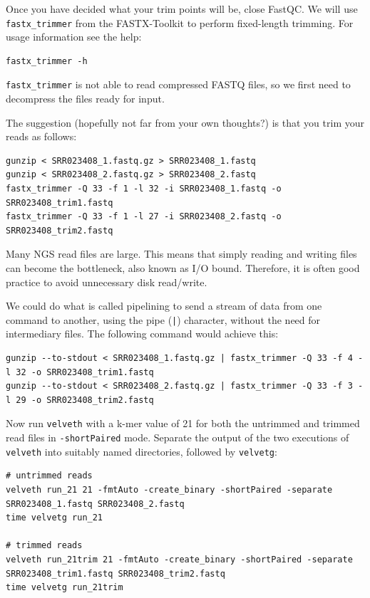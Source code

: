 \begin{steps}
Once you have decided what your trim points will be, close FastQC.
We will use \texttt{fastx\_trimmer} from the FASTX-Toolkit to perform
fixed-length trimming. For usage information see the help:
\begin{lstlisting}
fastx_trimmer -h
\end{lstlisting}

\begin{note}
\texttt{fastx\_trimmer} is not able to read compressed FASTQ files, so we first
need to decompress the files ready for input.
\end{note}

The suggestion (hopefully not far from your own thoughts?) is that you trim your
reads as follows:

\begin{lstlisting}
gunzip < SRR023408_1.fastq.gz > SRR023408_1.fastq
gunzip < SRR023408_2.fastq.gz > SRR023408_2.fastq
fastx_trimmer -Q 33 -f 1 -l 32 -i SRR023408_1.fastq -o SRR023408_trim1.fastq 
fastx_trimmer -Q 33 -f 1 -l 27 -i SRR023408_2.fastq -o SRR023408_trim2.fastq
\end{lstlisting}

\begin{advanced}
Many NGS read files are large. This means that simply reading and writing files
can become the bottleneck, also known as I/O bound. Therefore, it is often good practice to
avoid unnecessary disk read/write.

We could do what is called pipelining to send a stream of data from one command
to another, using the pipe (\texttt{|}) character, without the need for
intermediary files. The following command would achieve this:
\begin{lstlisting}
gunzip --to-stdout < SRR023408_1.fastq.gz | fastx_trimmer -Q 33 -f 4 -l 32 -o SRR023408_trim1.fastq 
gunzip --to-stdout < SRR023408_2.fastq.gz | fastx_trimmer -Q 33 -f 3 -l 29 -o SRR023408_trim2.fastq
\end{lstlisting}
\end{advanced}

Now run \texttt{velveth} with a k-mer value of 21 for both the untrimmed and
trimmed read files in \texttt{-shortPaired} mode. Separate the output of the two
executions of \texttt{velveth} into suitably named directories, followed by
\texttt{velvetg}:
\begin{lstlisting}
# untrimmed reads
velveth run_21 21 -fmtAuto -create_binary -shortPaired -separate SRR023408_1.fastq SRR023408_2.fastq
time velvetg run_21

# trimmed reads
velveth run_21trim 21 -fmtAuto -create_binary -shortPaired -separate SRR023408_trim1.fastq SRR023408_trim2.fastq
time velvetg run_21trim
\end{lstlisting}
\end{steps}

